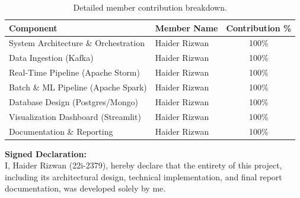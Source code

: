 \documentclass[12pt,a4paper]{article}
\begin{document}
\begin{table}[ht]
\centering
\small
\begin{tabular}{@{}llc@{}}
\toprule
\textbf{Component} & \textbf{Member Name} & \textbf{Contribution \%} \\
\midrule
System Architecture \& Orchestration & Haider Rizwan & 100\% \\
Data Ingestion (Kafka) & Haider Rizwan & 100\% \\
Real-Time Pipeline (Apache Storm) & Haider Rizwan & 100\% \\
Batch \& ML Pipeline (Apache Spark) & Haider Rizwan & 100\% \\
Database Design (Postgres/Mongo) & Haider Rizwan & 100\% \\
Visualization Dashboard (Streamlit) & Haider Rizwan & 100\% \\
Documentation \& Reporting & Haider Rizwan & 100\% \\
\bottomrule
\end{tabular}
\caption{Detailed member contribution breakdown.}
\label{tab:contribution}
\end{table}

\noindent
\textbf{Signed Declaration:} \\
I, Haider Rizwan (22i-2379), hereby declare that the entirety of this project, including its architectural design, technical implementation, and final report documentation, was developed solely by me.
\end{document}
